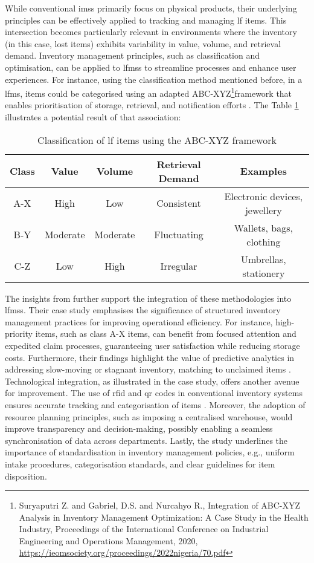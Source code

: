 While conventional \acp{ims} primarily focus on physical products, their underlying principles can be effectively applied to tracking and managing \ac{lf} items. This intersection becomes particularly relevant in environments where the inventory (in this case, lost items) exhibits variability in value, volume, and retrieval demand. Inventory management principles, such as classification and optimisation, can be applied to \acp{lfms} to streamline processes and enhance user experiences. For instance, using the classification method mentioned before, in a \ac{lfms}, items could be categorised using an adapted ABC-XYZ\footnote{Suryaputri Z. and Gabriel, D.S. and Nurcahyo R., Integration of ABC-XYZ Analysis in Inventory Management Optimization: A Case Study in the Health Industry, Proceedings of the International Conference on Industrial Engineering and Operations Management, 2020, \url{https://ieomsociety.org/proceedings/2022nigeria/70.pdf}}framework that enables prioritisation of storage, retrieval, and notification efforts \cite{Khobragade2018}. The Table \ref{tab:abc_xyz} illustrates a potential result of that association:

\begin{table}[H]
\centering
\caption{Classification of \ac{lf} items using the ABC-XYZ framework}
\begin{tabular}{|c|c|c|c|c|}
\hline
\textbf{Class} & \textbf{Value} & \textbf{Volume} & \textbf{Retrieval Demand} & \textbf{Examples} \\ 
\hline
A-X & High & Low & Consistent & Electronic devices, jewellery \\ 
\hline
B-Y & Moderate & Moderate & Fluctuating & Wallets, bags, clothing \\ 
\hline
C-Z & Low & High & Irregular & Umbrellas, stationery \\ 
\hline
\end{tabular}
\label{tab:abc_xyz}
\end{table}

The insights from  further support the integration of these methodologies into \acp{lfms}. Their case study emphasises the significance of structured inventory management practices for improving operational efficiency. For instance, high-priority items, such as class A-X items, can benefit from focused attention and expedited claim processes, guaranteeing user satisfaction while reducing storage costs. Furthermore, their findings highlight the value of predictive analytics in addressing slow-moving or stagnant inventory, matching to unclaimed items \cite{Plinere2016}. Technological integration, as illustrated in the case study, offers another avenue for improvement. The use of \ac{rfid} and \ac{qr} codes in conventional inventory systems ensures accurate tracking and categorisation of items \cite{Plinere2016, Sohail2018}. Moreover, the adoption of resource planning principles, such as imposing a centralised warehouse, would improve transparency and decision-making, possibly enabling a seamless synchronisation of data across departments. Lastly, the  study underlines the importance of standardisation in inventory management policies, e.g., uniform intake procedures, categorisation standards, and clear guidelines for item disposition.

